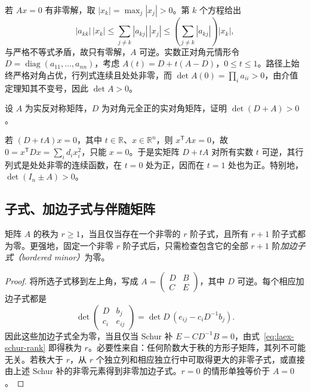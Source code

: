 \begin{solve}
若 $Ax=0$ 有非零解，取 $|x_k|=\max_j|x_j|>0$。第 $k$ 个方程给出
\[
|a_{kk}|\,|x_k|
\le\sum_{j\ne k}|a_{kj}|\,|x_j|
\le\left(\sum_{j\ne k}|a_{kj}|\right)|x_k|,
\]
与严格不等式矛盾，故只有零解，$A$ 可逆。实数正对角元情形令 $D=\operatorname{diag}(a_{11},\ldots,a_{nn})$，考虑 $A(t)=D+t(A-D)$，$0\le t\le1$。路径上始终严格对角占优，行列式连续且处处非零，而 $\det A(0)=\prod_i a_{ii}>0$，由介值定理知其不变号，因此 $\det A>0$。
\end{solve}

\begin{example}
\label{ex:laex-skew-positive}
设 $A$ 为实反对称矩阵，$D$ 为对角元全正的实对角矩阵，证明 $\det(D+A)>0$。
\end{example}

\begin{solve}
若 $(D+tA)x=0$，其中 $t\in\mathbb R$、$x\in\mathbb R^n$，则 $x^{\mathsf T}Ax=0$，故 $0=x^{\mathsf T}Dx=\sum_i d_ix_i^2$，只能 $x=0$。于是实矩阵 $D+tA$ 对所有实数 $t$ 可逆，其行列式是处处非零的连续函数，在 $t=0$ 处为正，因而在 $t=1$ 处也为正。特别地，$\det(I_n\pm A)>0$。
\end{solve}

\subsection{子式、加边子式与伴随矩阵}

\begin{proposition}
\label{prop:laex-bordered-minors}
矩阵 $A$ 的秩为 $r\ge1$，当且仅当存在一个非零的 $r$ 阶子式，且所有 $r+1$ 阶子式都为零。更强地，固定一个非零 $r$ 阶子式后，只需检查包含它的全部 $r+1$ 阶\emph{加边子式（bordered minor）}为零。
\end{proposition}

\begin{proof}
将所选子式移到左上角，写成 $A=\begin{pmatrix}D&B\\C&E\end{pmatrix}$，其中 $D$ 可逆。每个相应加边子式都是
\[
\det\begin{pmatrix}D&b_j\\c_i&e_{ij}\end{pmatrix}
=\det D\,(e_{ij}-c_iD^{-1}b_j).
\]
因此这些加边子式全为零，当且仅当 Schur 补 $E-CD^{-1}B=0$，由式~\eqref{eq:laex-schur-rank} 即得秩为 $r$。必要性来自：任何阶数大于秩的方形子矩阵，其列不可能无关。若秩大于 $r$，从 $r$ 个独立列和相应独立行中可取得更大的非零子式，或直接由上述 Schur 补的非零元素得到非零加边子式。$r=0$ 的情形单独等价于 $A=0$。
\end{proof}

